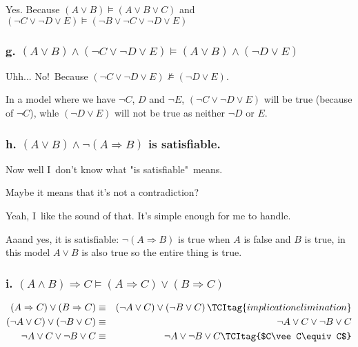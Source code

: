 \documentclass{article}
\begin{document}
Yes. Because $\left( A\vee B\right) \models \left( A\vee B\vee C\right) $
and $\left( \lnot C\vee \lnot D\vee E\right) \models \left( \lnot B\vee
\lnot C\vee \lnot D\vee E\right) $

\subsubsection{g. $\left( A\vee B\right) \wedge \left( \lnot C\vee \lnot
D\vee E\right) \models \left( A\vee B\right) \wedge \left( \lnot D\vee
E\right) $}

Uhh... No!\ Because $\left( \lnot C\vee \lnot D\vee E\right) \not\models
\left( \lnot D\vee E\right) $.

In a model where we have $\lnot C$, $D$ and $\lnot E$, $\left( \lnot C\vee
\lnot D\vee E\right) $ will be true (because of $\lnot C$), whle $\left(
\lnot D\vee E\right) $ will not be true as neither $\lnot D$ or $E$.

\subsubsection{h. $\left( A\vee B\right) \wedge \lnot \left( A\Rightarrow
B\right) $ is satisfiable.}

Now well I\ don't know what "is satisfiable"\ means.

Maybe it means that it's not a contradiction?

Yeah, I\ like the sound of that. It's simple enough for me to handle.

Aaand yes, it is satisfiable: $\lnot \left( A\Rightarrow B\right) $ is true
when $A$ is false and $B$ is true, in this model $A\vee B$ is also true so
the entire thing is true.

\subsubsection{i. $\left( A\wedge B\right) \Rightarrow C\models \left(
A\Rightarrow C\right) \vee \left( B\Rightarrow C\right) $}

\begin{eqnarray}
\left( A\Rightarrow C\right) \vee \left( B\Rightarrow C\right)  &\equiv
&\left( \lnot A\vee C\right) \vee \left( \lnot B\vee C\right)  
\TCItag{implication elimination} \\
\left( \lnot A\vee C\right) \vee \left( \lnot B\vee C\right)  &\equiv &\lnot
A\vee C\vee \lnot B\vee C  \nonumber \\
\lnot A\vee C\vee \lnot B\vee C &\equiv &\lnot A\vee \lnot B\vee C 
\TCItag{$C\vee C\equiv C$}
\end{eqnarray}
\end{document}
